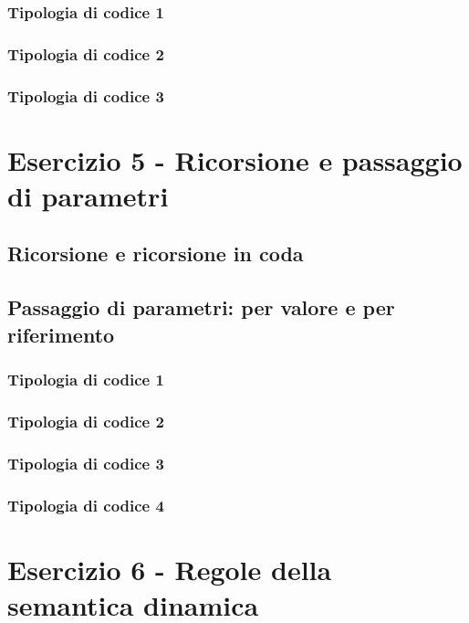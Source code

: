 \documentclass[a4paper]{article}
\begin{document}
	\subsubsection{Tipologia di codice 1}
	
	\subsubsection{Tipologia di codice 2}
	
	\subsubsection{Tipologia di codice 3}
	
	\section{Esercizio 5 - Ricorsione e passaggio di parametri}
	
	\subsection{Ricorsione e ricorsione in coda}
	
	\subsection{Passaggio di parametri: per valore e per riferimento}
	
	\subsubsection{Tipologia di codice 1}
	
	\subsubsection{Tipologia di codice 2}
	
	\subsubsection{Tipologia di codice 3}
	
	\subsubsection{Tipologia di codice 4}
	
	\section{Esercizio 6 - Regole della semantica dinamica}
	
\end{document}
